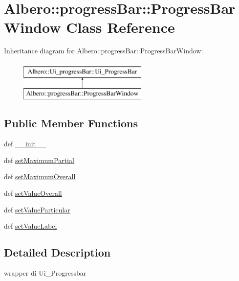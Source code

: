 \hypertarget{classAlbero_1_1progressBar_1_1ProgressBarWindow}{
\section{Albero::progressBar::ProgressBarWindow Class Reference}
\label{classAlbero_1_1progressBar_1_1ProgressBarWindow}
}
Inheritance diagram for Albero::progressBar::ProgressBarWindow:\begin{figure}[H]
\begin{center}
\leavevmode
\includegraphics[height=2.000000cm]{classAlbero_1_1progressBar_1_1ProgressBarWindow}
\end{center}
\end{figure}
\subsection*{Public Member Functions}
\begin{DoxyCompactItemize}
\item 
def \hyperlink{classAlbero_1_1progressBar_1_1ProgressBarWindow_a69db0add10cd96738c46301516b7c4a0}{\_\-\_\-init\_\-\_\-}
\item 
def \hyperlink{classAlbero_1_1progressBar_1_1ProgressBarWindow_a011237405e716a8493425aec2613c9c7}{setMaximumPartial}
\item 
def \hyperlink{classAlbero_1_1progressBar_1_1ProgressBarWindow_af691a3db50075e71ace9921ec0095682}{setMaximumOverall}
\item 
def \hyperlink{classAlbero_1_1progressBar_1_1ProgressBarWindow_a405af74b8874dd57f8ae4d9e14898dfd}{setValueOverall}
\item 
def \hyperlink{classAlbero_1_1progressBar_1_1ProgressBarWindow_a48bac1613a870ecd196f2af9d71d1975}{setValueParticular}
\item 
def \hyperlink{classAlbero_1_1progressBar_1_1ProgressBarWindow_a038cf5ceda11ae22503706ecc8ff129c}{setValueLabel}
\end{DoxyCompactItemize}


\subsection{Detailed Description}
\begin{DoxyVerb}wrapper di Ui_Progressbar
\end{DoxyVerb}
 

